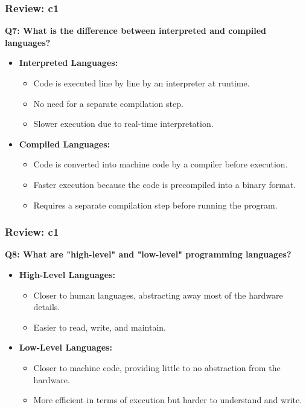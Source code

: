 \documentclass[
	11pt, %
]{beamer}
\begin{document}


\begin{frame}
	\frametitle{Review: c1}

    \label{slide:q7}

\textbf{Q7: What is the difference between interpreted and compiled languages?}
	\begin{itemize}
	    \item \textbf{Interpreted Languages:}
	    \begin{itemize}
	        \item Code is executed line by line by an interpreter at runtime.
	        \item No need for a separate compilation step.
	        \item Slower execution due to real-time interpretation.
	    \end{itemize}
	    
	    \item \textbf{Compiled Languages:}
	    \begin{itemize}
	        \item Code is converted into machine code by a compiler before execution.
	        \item Faster execution because the code is precompiled into a binary format.
	        \item Requires a separate compilation step before running the program.
	    \end{itemize}
	\end{itemize}


\end{frame}



\begin{frame}
	\frametitle{Review: c1}

	\textbf{Q8: What are "high-level" and "low-level" programming languages?}

	\begin{itemize}
	    \item \textbf{High-Level Languages:}
	    \begin{itemize}
	        \item Closer to human languages, abstracting away most of the hardware details.
	        \item Easier to read, write, and maintain.
	    \end{itemize}
	    
	    \item \textbf{Low-Level Languages:}
	    \begin{itemize}
	        \item Closer to machine code, providing little to no abstraction from the hardware.
	        \item More efficient in terms of execution but harder to understand and write.
	    \end{itemize}
	\end{itemize}

\end{frame}
\end{document}
